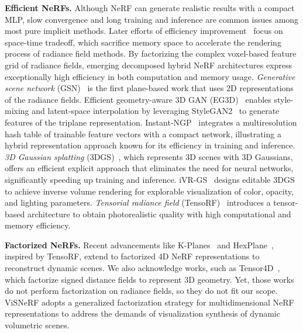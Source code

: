 {\bf Efficient NeRFs.}
Although NeRF can generate realistic results with a compact MLP, slow convergence and long training and inference are common issues among most pure implicit methods.
Later efforts of efficiency improvement~\cite{Liu-NSVF-NeurIPS20, Yu-PlenOctrees-ICCV21, Fridovich-Keil-Plenoxels-CVPR22} focus on space-time tradeoff, which sacrifice memory space to accelerate the rendering process of radiance field methods. 
By factorizing the complex voxel-based feature grid of radiance fields, emerging decomposed hybrid NeRF architectures express exceptionally high efficiency in both computation and memory usage. 
{\em Generative scene network} (GSN)~\cite{Devries-GSN-ICCV21} is the first plane-based work that uses 2D representations of the radiance fields.
Efficient geometry-aware 3D GAN (EG3D)~\cite{Chan-EG3D-CVPR22} enables style-mixing and latent-space interpolation by leveraging StyleGAN2~\cite{Karras-StyleGAN2-CVPR20} to generate features of the triplane representation.
Instant-NGP~\cite{Thomas-InstantNGP} integrates a multiresolution hash table of trainable feature vectors with a compact network, illustrating a hybrid representation approach known for its efficiency in training and inference.
{\em 3D Gaussian splatting} (3DGS)~\cite{Kerbl-TOG23}, which represents 3D scenes with 3D Gaussians, offers an efficient explicit approach that eliminates the need for neural networks, significantly speeding up training and inference.
iVR-GS~\cite{Tang-PVIS25} designs editable 3DGS to achieve inverse volume rendering for explorable visualization of color, opacity, and lighting parameters. 
{\em Tensorial radiance field} (TensoRF)~\cite{Chen-TensoRF-ECCV22} introduces a tensor-based architecture to obtain photorealistic quality with high computational and memory efficiency.

{\bf Factorized NeRFs.}
Recent advancements like K-Planes~\cite{Fridovich-Keil-K-Planes-CVPR23} and HexPlane~\cite{Cao-HexPlane-CVPR23}, inspired by TensoRF, extend to factorized 4D NeRF representations to reconstruct dynamic scenes.
We also acknowledge works, such as Tensor4D~\cite{Shao-Tensor4D-CVPR23}, which factorize signed distance fields to represent 3D geometry. 
Yet, those works do not perform factorization on radiance fields, so they do not fit our scope.
ViSNeRF adopts a generalized factorization strategy for multidimensional NeRF representations to address the demands of visualization synthesis of dynamic volumetric scenes.

